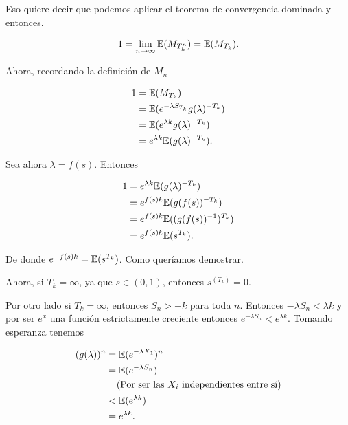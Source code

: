     Eso quiere decir que podemos aplicar el teorema de convergencia dominada y entonces.
    
    \begin{align}
        1 = \lim_{n \rightarrow \infty} \mathbb{E}(M_{T_k^n}) = \mathbb{E}(M_{T_k}).
    \end{align}\par\null
        
    Ahora, recordando la definición de $M_n$
    
    \begin{align}
       1    &=  \mathbb{E}(M_{T_k})                                 \\
            &=  \mathbb{E}(e^{-\lambda S_{T_k}} g(\lambda)^{-T_k})  \\
            &=  \mathbb{E}(e^{\lambda k} g(\lambda)^{-T_k})         \\
            &=  e^{\lambda k} \mathbb{E}(g(\lambda)^{-T_k}).        
    \end{align}\par\null
    
    Sea ahora $\lambda = f(s)$. Entonces
    
    \begin{align}
        1   &=  e^{\lambda k} \mathbb{E}(g(\lambda)^{-T_k})        \\
            &=  e^{f(s) k} \mathbb{E}(g(f(s))^{-T_k})              \\
            &=  e^{f(s) k} \mathbb{E}((g(f(s))^{-1})^{T_k})        \\            
            &=  e^{f(s) k} \mathbb{E}(s^{T_k}).                 
    \end{align}\par\null
    
    De donde $e^{-f(s) k} = \mathbb{E}(s^{T_k})$. Como queríamos demostrar.\par\null
    
    Ahora, si $T_k = \infty$, ya que $s \in (0,1)$, entonces $s^(T_k) = 0$.\par\null
    
    Por otro lado si $T_k = \infty$, entonces $S_n > -k$ para toda $n$. Entonces
    $-\lambda S_n < \lambda k$ y por ser $e^x$ una función estrictamente creciente entonces
    $e^{-\lambda S_n} < e^{\lambda k}$. Tomando esperanza tenemos
    
    \begin{align}
            (g(\lambda))^n      &=  \mathbb{E}(e^{-\lambda X_1})^{n}                                    \\ 
                                &=  \mathbb{E}(e^{-\lambda S_n})                                        \\
                                &\;\;\;\;\mbox{(Por ser las $X_i$ independientes entre sí)}     \\
                                &<  \mathbb{E}(e^{\lambda k})                                           \\
                                &=   e^{\lambda k}.
    \end{align}\par\null
    
